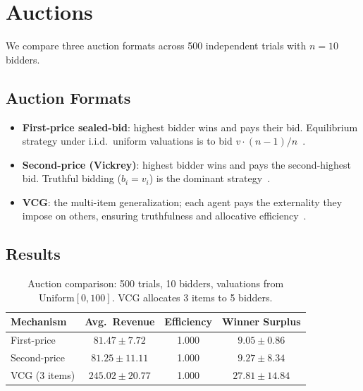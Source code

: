 \documentclass[10pt]{article}
\begin{document}
\section{Auctions}
\label{sec:auctions}

We compare three auction formats across 500 independent trials with $n=10$ bidders.

\subsection{Auction Formats}

\begin{itemize}[leftmargin=*,itemsep=1pt]
  \item \textbf{First-price sealed-bid}: highest bidder wins and pays their bid. Equilibrium strategy under i.i.d.\ uniform valuations is to bid $v \cdot (n-1)/n$~\citep{vickrey1961counterspeculation}.
  \item \textbf{Second-price (Vickrey)}: highest bidder wins and pays the second-highest bid. Truthful bidding ($b_i = v_i$) is the dominant strategy~\citep{vickrey1961counterspeculation}.
  \item \textbf{VCG}: the multi-item generalization; each agent pays the externality they impose on others, ensuring truthfulness and allocative efficiency~\citep{clarke1971multipart, groves1973incentives}.
\end{itemize}

\subsection{Results}

\begin{table}[t]
\centering
\caption{Auction comparison: 500 trials, 10 bidders, valuations from $\mathrm{Uniform}[0,100]$. VCG allocates 3 items to 5 bidders.}
\label{tab:auctions}
\begin{tabular}{lccc}
\toprule
\textbf{Mechanism} & \textbf{Avg.\ Revenue} & \textbf{Efficiency} & \textbf{Winner Surplus} \\
\midrule
First-price  & $81.47 \pm 7.72$  & 1.000 & $9.05 \pm 0.86$ \\
Second-price & $81.25 \pm 11.11$ & 1.000 & $9.27 \pm 8.34$ \\
VCG (3 items)& $245.02 \pm 20.77$ & 1.000 & $27.81 \pm 14.84$ \\
\bottomrule
\end{tabular}
\end{table}
\end{document}
